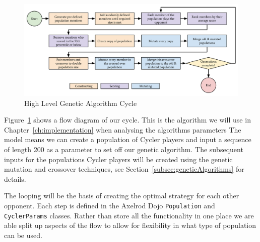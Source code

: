 \begin{figure}[ht]
    \includegraphics[width=1.0\textwidth, center]{./img/flows/custom_ga_cycle}
    \caption{High Level Genetic Algorithm Cycle}\label{fig:customGAcycle}
\end{figure}

Figure~\ref{fig:customGAcycle} shows a flow diagram of our cycle.
This is the algorithm we will use in Chapter~\ref{ch:implementation} when analysing the algorithms parameters
The model means we can create a population of Cycler players and input a sequence of length 200 as a parameter to set off our genetic algorithm.
The subsequent inputs for the populations Cycler players will be created using the genetic mutation and crossover techniques, see Section~\ref{subsec:geneticAlgorithms} for details.

The looping will be the basis of creating the optimal strategy for each other opponent.
Each step is defined in the Axelrod Dojo \texttt{Population} and \texttt{CyclerParams} classes.
Rather than store all the functionality in one place we are able split up aspects of the flow to allow for flexibility in what type of population can be used.